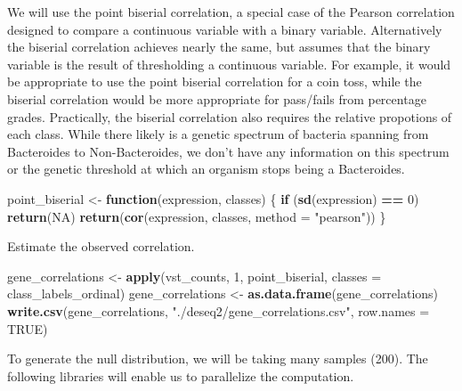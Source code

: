 \documentclass[
]{book}
\newenvironment{Shaded}{\begin{snugshade}}{\end{snugshade}}
\newcommand{\AttributeTok}[1]{\textcolor[rgb]{0.13,0.29,0.53}{#1}}
\newcommand{\ConstantTok}[1]{\textcolor[rgb]{0.56,0.35,0.01}{#1}}
\newcommand{\ControlFlowTok}[1]{\textcolor[rgb]{0.13,0.29,0.53}{\textbf{#1}}}
\newcommand{\DecValTok}[1]{\textcolor[rgb]{0.00,0.00,0.81}{#1}}
\newcommand{\FunctionTok}[1]{\textcolor[rgb]{0.13,0.29,0.53}{\textbf{#1}}}
\newcommand{\NormalTok}[1]{#1}
\newcommand{\OtherTok}[1]{\textcolor[rgb]{0.56,0.35,0.01}{#1}}
\newcommand{\SpecialCharTok}[1]{\textcolor[rgb]{0.81,0.36,0.00}{\textbf{#1}}}
\newcommand{\StringTok}[1]{\textcolor[rgb]{0.31,0.60,0.02}{#1}}
\begin{document}
We will use the point biserial correlation, a special case of the Pearson correlation designed to compare a continuous variable with a binary variable.
Alternatively the biserial correlation achieves nearly the same, but assumes that the binary variable is the result of thresholding a continuous variable.
For example, it would be appropriate to use the point biserial correlation for a coin toss, while the biserial correlation would be more appropriate for pass/fails from percentage grades.
Practically, the biserial correlation also requires the relative propotions of each class. While there likely is a genetic spectrum of bacteria spanning
from Bacteroides to Non-Bacteroides, we don't have any information on this spectrum or the genetic threshold at which an organism stops being a Bacteroides.

\begin{Shaded}
\begin{Highlighting}[numbers=left,,]
\NormalTok{point\_biserial }\OtherTok{\textless{}{-}} \ControlFlowTok{function}\NormalTok{(expression, classes) \{}
  \ControlFlowTok{if}\NormalTok{ (}\FunctionTok{sd}\NormalTok{(expression) }\SpecialCharTok{==} \DecValTok{0}\NormalTok{) }\FunctionTok{return}\NormalTok{(}\ConstantTok{NA}\NormalTok{)}
  \FunctionTok{return}\NormalTok{(}\FunctionTok{cor}\NormalTok{(expression, classes, }\AttributeTok{method =} \StringTok{"pearson"}\NormalTok{))}
\NormalTok{\}}
\end{Highlighting}
\end{Shaded}

Estimate the observed correlation.

\begin{Shaded}
\begin{Highlighting}[numbers=left,,]
\NormalTok{gene\_correlations }\OtherTok{\textless{}{-}} \FunctionTok{apply}\NormalTok{(vst\_counts, }\DecValTok{1}\NormalTok{, point\_biserial, }\AttributeTok{classes =}\NormalTok{ class\_labels\_ordinal)}
\NormalTok{gene\_correlations }\OtherTok{\textless{}{-}} \FunctionTok{as.data.frame}\NormalTok{(gene\_correlations)}
\FunctionTok{write.csv}\NormalTok{(gene\_correlations, }\StringTok{"./deseq2/gene\_correlations.csv"}\NormalTok{, }\AttributeTok{row.names =} \ConstantTok{TRUE}\NormalTok{)}
\end{Highlighting}
\end{Shaded}

To generate the null distribution, we will be taking many samples (200). The following libraries will enable us to parallelize the computation.
\end{document}
